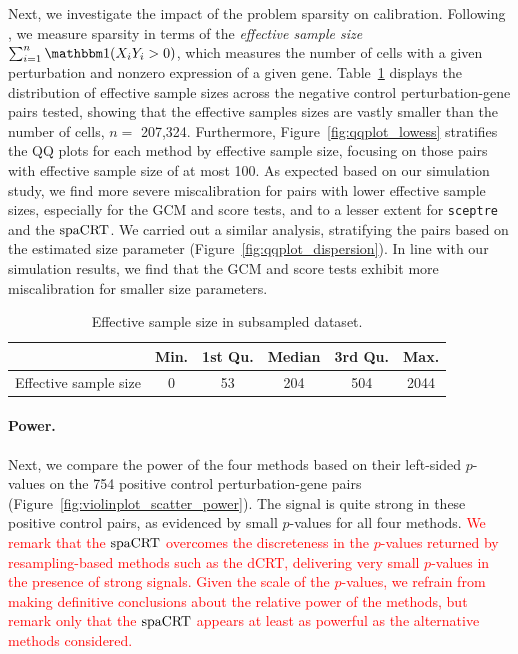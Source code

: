 \documentclass[12pt]{article}
\theoremstyle{definition}
\newcommand{\indicator}{\mathbbm 1}						%
\newcommand{\spacrt}{\textnormal{spaCRT}}               %
\begin{document}
Next, we investigate the impact of the problem sparsity on calibration. Following \citep{Barry2024}, we measure sparsity in terms of the \textit{effective sample size} $\sum_{i = 1}^n \indicator(X_{i} Y_{i} > 0)$, which measures the number of cells with a given perturbation and nonzero expression of a given gene. Table~\ref{tab:sparsity_level_ess} displays the distribution of effective sample sizes across the negative control perturbation-gene pairs tested, showing that the effective samples sizes are vastly smaller than the number of cells, $n =$ 207,324. Furthermore, Figure~\ref{fig:qqplot_lowess} stratifies the QQ plots for each method by effective sample size, focusing on those pairs with effective sample size of at most 100. As expected based on our simulation study, we find more severe miscalibration for pairs with lower effective sample sizes, especially for the GCM and score tests, and to a lesser extent for \verb|sceptre| and the $\spacrt$. We carried out a similar analysis, stratifying the pairs based on the estimated size parameter (Figure~\ref{fig:qqplot_dispersion}). In line with our simulation results, we find that the GCM and score tests exhibit more miscalibration for smaller size parameters. 


\begin{table}[h!]
  \centering
  \begin{tabular}[t]{lccccc}
  \toprule
    & Min. & 1st Qu. & Median & 3rd Qu. & Max.\\
  \midrule
  Effective sample size & 0   &   53   &  204  &   504  & 2044 \\
  \bottomrule
  \end{tabular}
  \caption{Effective sample size in subsampled dataset.}
  \label{tab:sparsity_level_ess}
\end{table}

\paragraph{Power.}

Next, we compare the power of the four methods based on their left-sided $p$-values on the 754 positive control perturbation-gene pairs (Figure~\ref{fig:violinplot_scatter_power}). The signal is quite strong in these positive control pairs, as evidenced by small $p$-values for all four methods. \textcolor{red}{We remark that the $\spacrt$ overcomes the discreteness in the $p$-values returned by resampling-based methods such as the dCRT, delivering very small $p$-values in the presence of strong signals. Given the scale of the $p$-values, we refrain from making definitive conclusions about the relative power of the methods, but remark only that the $\spacrt$ appears at least as powerful as the alternative methods considered.}
\end{document}
